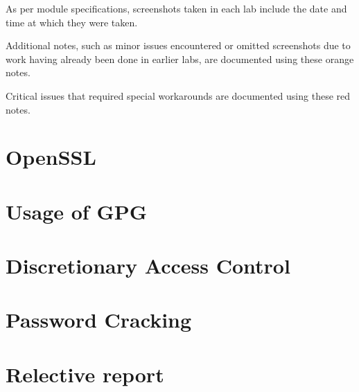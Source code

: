 \documentclass[12pt]{report}
\begin{document}
    As per module specifications, screenshots taken in each lab
    include the date and time at which they were taken.\\

    \vspace{50pt}

    \begin{tcolorbox}[colback=orange!5!white,colframe=orange!75!black,title=Example note]
        Additional notes, such as minor issues encountered or omitted screenshots due to
        work having already been done in earlier labs, are documented using these orange notes.
    \end{tcolorbox}

    \vspace{5pt}

    \begin{tcolorbox}[colback=red!5!white,colframe=red!75!black,title=Example important note]
        Critical issues that required special workarounds are documented using these red notes.
    \end{tcolorbox}


    \chapter{OpenSSL}\label{ch:lab1}
    

    \newpage

    \chapter{Usage of GPG}\label{ch:lab2}
    

    \addtocounter{chapter}{2} %
    \chapter{Discretionary Access Control}\label{ch:lab5}
    

    \chapter{Password Cracking}\label{ch:lab6}
    

    \chapter*{Relective report}\label{ch:conclusion}
\end{document}
